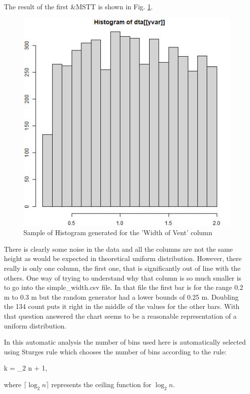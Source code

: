 \documentclass[12pt,twoside]{book}
\begin{document}
The result of the first {\ct \&MSTT} is shown in Fig. \ref{simple_width_hist}.

\begin{figure}[h!]
\centering
\includegraphics[width=4.5in]{FIGURES/simple_width.jpeg}
\caption{Sample of Histogram generated for the 'Width of Vent' column}
\label{simple_width_hist}
\end{figure}

There is clearly some noise in the data and all the columns are not the same height as would be expected in theoretical uniform distribution. However, there really is only one column, the first one, that is significantly out of line with the others. One way of trying to understand why that column is so much smaller is to go into the {\ct simple\_width.csv} file. In that file the first bar is for the range 0.2 m to 0.3 m but the random generator had a lower bounds of 0.25 m. Doubling the 134 count  puts it right in the middle of the values for the other bars. With that question answered the chart seems to be a reasonable representation of a uniform distribution.

In this automatic analysis the number of bins used here is automatically selected using Sturges rule \cite{Sturges_1926} which chooses the number of bins according to the rule:

\be
k = \lceil \log_2 n \rceil + 1,
\ee

where  $\lceil \log_2 n \rceil$ represents the ceiling function for $ \log_2 n$.
\end{document}
